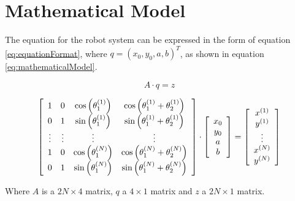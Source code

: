     \section{Mathematical Model}

The equation for the robot system can be expressed in the form of equation \ref{eq:equationFormat}, where $q = (x_0, y_0, a, b)^T$, as shown in equation \ref{eq:mathematicalModel}.

\begin{equation}
A \cdot q = z
\label{eq:equationFormat}
\end{equation}

\begin{equation}
\left[
\begin{array}{c c c c}
1 & 0 & \cos\left( \theta_1^{(1)}\right)  & \cos\left(\theta_1^{(1)} + \theta_2^{(1)} \right) \\
0 & 1 & \sin\left(\theta_1^{(1)}\right)  & \sin\left(\theta_1^{(1)} + \theta_2^{(1)}\right)  \\
\vdots & \vdots & \vdots & \vdots \\
1 & 0 & \cos\left(\theta_1^{(N)}\right)  & \cos\left(\theta_1^{(N)} + \theta_2^{(N)}\right)  \\
0 & 1 & \sin\left(\theta_1^{(N)}\right)  & \sin\left(\theta_1^{(N)} + \theta_2^{(N)}\right)  \\
\end{array}
\right]
\cdot
\left[
\begin{array}{c}
x_0 \\
y_0 \\
a \\
b \\
\end{array}
\right]
=
\left[
\begin{array}{c}
x^{(1)} \\
y^{(1)} \\
\vdots \\
x^{(N)} \\
y^{(N)} \\
\end{array}
\right]
\label{eq:mathematicalModel}
\end{equation}

Where $A$ is a $2 N \times 4$ matrix, $q$ a $4 \times 1$ matrix and $z$ a $2 N \times 1$ matrix.